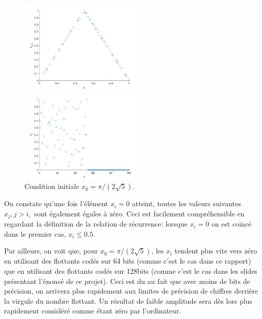 \documentclass[a4paper, 12pt]{report}
\begin{document}
\begin{figure}[H]
    \centering
    \begin{minipage}[t]{6cm}
        \centering
        \includegraphics[width=6cm]{images/x0en_x_i_x_i_plus_1.png}
    \end{minipage}\hspace{1cm}
    \begin{minipage}[t]{6cm}
        \centering
        \includegraphics[width=6cm]{images/x0en_i_x_i.png}
    \end{minipage}
    \caption{Condition initiale $x_0 = \pi/(2 \sqrt{5})$.}
\end{figure}

On constate qu'une fois l'élément $x_i = 0$ atteint, toutes les valeurs suivantes
$x_j, j>i,$ sont également égales à zéro. Ceci est facilement compréhensible
en regardant la définition de la relation de récurrence: lorsque $x_i=0$
on est coincé dans le premier cas, $x_i \le 0.5$.

Par ailleurs, on voit que, pour $x_0 = \pi/(2 \sqrt{5})$,
les $x_i$ tendent plus vite vers zéro en utilisant des flottants codés sur 64 bits
(comme c'est le cas dans ce rapport) que en utilisant des flottants codés
sur 128bits (comme c'est le cas dans les slides présentant l'énoncé de
ce projet). Ceci est du au fait que avec moins de bits de précision, on
arrivera plus rapidement aux limites de précision de chiffres derrière la virgule
du nombre flottant. Un résultat de faible amplitude sera dès lors plus
rapidement considéré comme étant zéro par l'ordinateur.
\end{document}
